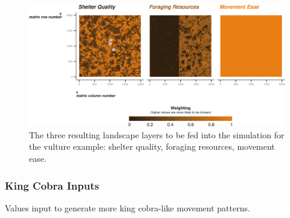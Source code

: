 \documentclass[10pt,a4paper]{article}
\begin{document}
\begin{figure}

{\centering \includegraphics{Agent-based_model_walkthrough_files/figure-latex/VULTURElayersFigure-1} 

}

\caption{The three resulting landscape layers to be fed into the simulation for the vulture example: shelter quality, foraging resources, movement ease.}\label{fig:VULTURElayersFigure}
\end{figure}

\hypertarget{king-cobra-inputs}{%
\subsubsection{King Cobra Inputs}\label{king-cobra-inputs}}

Values input to generate more king cobra-like movement patterns.
\end{document}
